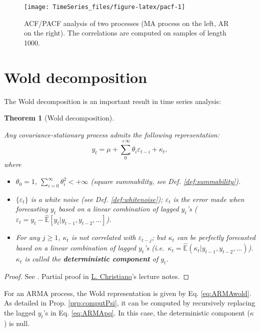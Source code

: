 \documentclass[
  12pt,
]{book}
\providecommand{\tightlist}{%
  \setlength{\itemsep}{0pt}\setlength{\parskip}{0pt}}
\newtheorem{theorem}{Theorem}[chapter]
\theoremstyle{definition}
\theoremstyle{definition}
\theoremstyle{definition}
\theoremstyle{definition}
\theoremstyle{remark}
\begin{document}
\begin{figure}
\texttt{[image: TimeSeries\_files/figure-latex/pacf-1]} \caption{ACF/PACF analysis of two processes (MA process on the left, AR on the right). The correlations are computed on samples of length 1000.}\label{fig:pacf}
\end{figure}

\hypertarget{wold-decomposition}{%
\section{Wold decomposition}\label{wold-decomposition}}

The Wold decomposition is an important result in time series analysis:

\begin{theorem}[Wold decomposition]
\protect\hypertarget{thm:Wold}{}\label{thm:Wold}

Any covariance-stationary process admits the following representation:
\[
y_t = \mu + \sum_{0}^{+\infty} \theta_i \varepsilon_{t-i} + \kappa_t,
\]
where

\begin{itemize}
\tightlist
\item
  \(\theta_0 = 1\), \(\sum_{i=0}^{\infty} \theta_i^2 < +\infty\) (square summability, see Def. \ref{def:summability}).
\item
  \(\{\varepsilon_t\}\) is a white noise (see Def. \ref{def:whitenoise}); \(\varepsilon_t\) is the error made when forecasting \(y_t\) based on a linear combination of lagged \(y_t\)'s (\(\varepsilon_t = y_t - \hat{\mathbb{E}}[y_t|y_{t-1},y_{t-2},\dots]\)).
\item
  For any \(j \ge 1\), \(\kappa_t\) is not correlated with \(\varepsilon_{t-j}\); but \(\kappa_t\) can be perfectly forecasted based on a linear combination of lagged \(y_t\)'s (i.e.~\(\kappa_t = \hat{\mathbb{E}}(\kappa_t|y_{t-1},y_{t-2},\dots)\)). \(\kappa_t\) is called the \textbf{deterministic component} of \(y_t\).
\end{itemize}

\end{theorem}

\begin{proof}
See \citet{Anderson_1971}. Partial proof in \href{http://faculty.wcas.northwestern.edu/~lchrist/finc520/wold.pdf}{L. Christiano}'s lecture notes.
\end{proof}

For an ARMA process, the Wold representation is given by Eq. \eqref{eq:ARMAwold}. As detailed in Prop. \ref{prp:computPsi}, it can be computed by recursively replacing the lagged \(y_t\)'s in Eq. \eqref{eq:ARMApq}. In this case, the deterministic component (\(\kappa\)) is null.
\end{document}
